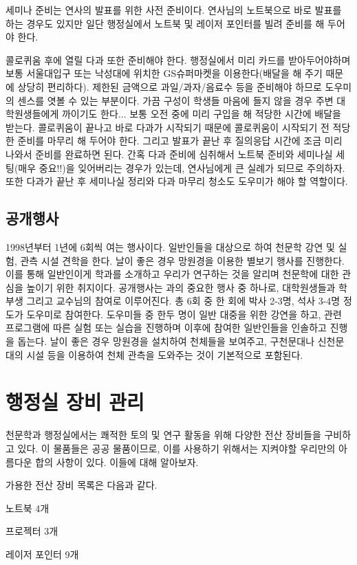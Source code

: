세미나 준비는 연사의 발표를 위한 사전 준비이다. 연사님의 노트북으로 바로 발표를
하는 경우도 있지만 일단 행정실에서 노트북 및 레이저 포인터를 빌려 준비를 해
두어야 한다.

콜로퀴움 후에 열릴 다과 또한 준비해야 한다. 행정실에서 미리 카드를 받아두어야하며
보통 서울대입구 또는 낙성대에 위치한 GS슈퍼마켓을 이용한다(배달을 해 주기 때문에
상당히 편리하다). 제한된 금액으로 과일/과자/음료수 등을 준비해야 하므로 도우미의
센스를 엿볼 수 있는 부분이다. 가끔 구성이 학생들 마음에 들지 않을 경우 주변
대학원생들에게 까이기도 한다... 보통 오전 중에 미리 구입을 해 적당한 시간에
배달을 받는다. 콜로퀴움이 끝나고 바로 다과가 시작되기 때문에 콜로퀴움이 시작되기
전 적당한 준비를 마무리 해 두어야 한다. 그리고 발표가 끝난 후 질의응답 시간에
조금 미리 나와서 준비를 완료하면 된다. 간혹 다과 준비에 심취해서 노트북 준비와
세미나실 세팅(매우 중요!!)을 잊어버리는 경우가 있는데, 연사님에게 큰 실례가
되므로 주의하자. 또한 다과가 끝난 후 세미나실 정리와 다과 마무리 청소도 도우미가
해야 할 역할이다.

\subsection{공개행사}
1998년부터 1년에 6회씩 여는 행사이다. 일반인들을 대상으로 하여 천문학 강연 및
실험, 관측 시설 견학을 한다. 날이 좋은 경우 망원경을 이용한 별보기 행사를
진행한다. 이를 통해 일반인이게 학과를 소개하고 우리가 연구하는 것을 알리며
천문학에 대한 관심을 높이기 위한 취지이다. 공개행사는 과의 중요한 행사 중
하나로, 대학원생들과 학부생 그리고 교수님의 참여로 이루어진다. 총 6회 중 한 회에
박사 2-3명, 석사 3-4명 정도가 도우미로 참여한다. 도우미들 중 한두 명이 일반
대중을 위한 강연을 하고, 관련 프로그램에 따른 실험 또는 실습을 진행하며 이후에
참여한 일반인들을 인솔하고 진행을 돕는다. 날이 좋은 경우 망원경을 설치하여
천체들을 보여주고, 구천문대나 신천문대의 시설 등을 이용하여 천체 관측을 도와주는
것이 기본적으로 포함된다.


\section{행정실 장비 관리}
천문학과 행정실에서는 쾌적한 토의 및 연구 활동을 위해 다양한 전산 장비들을
구비하고 있다. 이 물품들은 공공 물품이므로, 이를 사용하기 위해서는 지켜야할
우리만의 아름다운 합의 사항이 있다. 이들에 대해 알아보자.

가용한 전산 장비 목록은 다음과 같다.
\begin{packed_item}
\item 노트북 4개
\item 프로젝터 3개
\item 레이저 포인터 9개
\end{packed_item}


